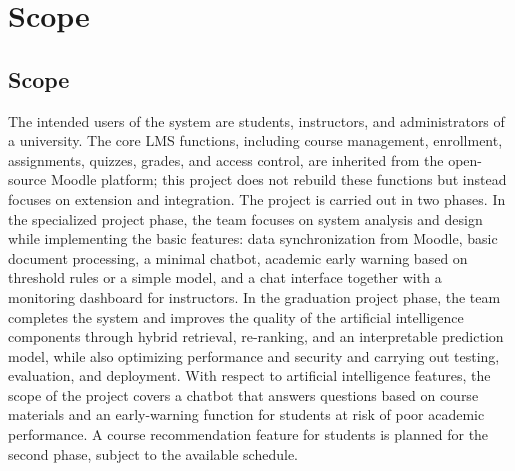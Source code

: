 \section{Scope}

\subsection{Scope}
The intended users of the system are students, instructors, and administrators of a university. The core LMS functions, including course management, enrollment, assignments, quizzes, grades, and access control, are inherited from the open-source Moodle platform; this project does not rebuild these functions but instead focuses on extension and integration.
The project is carried out in two phases. In the specialized project phase, the team focuses on system analysis and design while implementing the basic features: data synchronization from Moodle, basic document processing, a minimal chatbot, academic early warning based on threshold rules or a simple model, and a chat interface together with a monitoring dashboard for instructors. In the graduation project phase, the team completes the system and improves the quality of the artificial intelligence components through hybrid retrieval, re-ranking, and an interpretable prediction model, while also optimizing performance and security and carrying out testing, evaluation, and deployment.
With respect to artificial intelligence features, the scope of the project covers a chatbot that answers questions based on course materials and an early-warning function for students at risk of poor academic performance. A course recommendation feature for students is planned for the second phase, subject to the available schedule.

